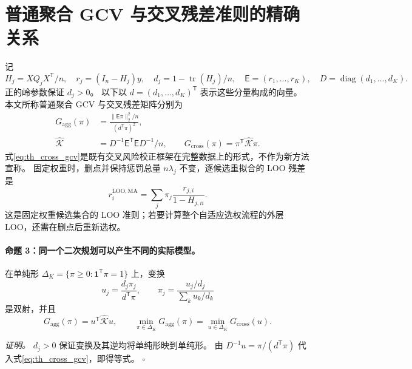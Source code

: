 \section{普通聚合 GCV 与交叉残差准则的精确关系}\label{sec:theory_gcv}
记
\begin{equation}\label{eq:th_gcv_notation}
 H_j=XQ_jX^{\mathsf T}/n,\quad r_j=(I_n-H_j)y,\quad
 d_j=1-\operatorname{tr}(H_j)/n,\quad
 \mathsf E=(r_1,\ldots,r_K),\quad D=\operatorname{diag}(d_1,\ldots,d_K).
\end{equation}
正的岭参数保证 $d_j>0$。
以下以 $d=(d_1,\ldots,d_K)^{\mathsf T}$ 表示这些分量构成的向量。
本文所称普通聚合 GCV 与交叉残差矩阵分别为
\begin{align}
 G_{\mathrm{agg}}(\pi)
 &=\frac{\lVert\mathsf E\pi\rVert_2^2/n}{(d^{\mathsf T}\pi)^2},\label{eq:th_agg_gcv}\\
 \widehat{\mathcal K}
 &=D^{-1}\mathsf E^{\mathsf T}\mathsf E D^{-1}/n,\qquad
 G_{\mathrm{cross}}(\pi)=\pi^{\mathsf T}\widehat{\mathcal K}\pi.
 \label{eq:th_cross_gcv}
\end{align}
式\eqref{eq:th_cross_gcv}是既有交叉风险校正框架在完整数据上的形式\cite{bellec}，不作为新方法宣称。
固定权重时，删点并保持惩罚总量 $n\lambda_j$ 不变，逐候选重拟合的 LOO 残差是
\begin{equation}\label{eq:th_loo}
 r_i^{\mathrm{LOO,MA}}=\sum_j\pi_j\frac{r_{j,i}}{1-H_{j,ii}}.
\end{equation}
这是固定权重候选集合的 LOO 准则；若要计算整个自适应选权流程的外层 LOO，还需在删点后重新选权。

\paragraph{命题 3：同一个二次规划可以产生不同的实际模型。}
在单纯形 $\Delta_K=\{\pi\ge0:\boldsymbol1^{\mathsf T}\pi=1\}$ 上，变换
\begin{equation}\label{eq:th_gcv_map}
 u_j=\frac{d_j\pi_j}{d^{\mathsf T}\pi},\qquad
 \pi_j=\frac{u_j/d_j}{\sum_k u_k/d_k}
\end{equation}
是双射，并且
\begin{equation}\label{eq:th_gcv_equiv}
 G_{\mathrm{agg}}(\pi)=u^{\mathsf T}\widehat{\mathcal K}u,\qquad
 \min_{\pi\in\Delta_K}G_{\mathrm{agg}}(\pi)
 =\min_{u\in\Delta_K}G_{\mathrm{cross}}(u).
\end{equation}

\textit{证明。}
$d_j>0$ 保证变换及其逆均将单纯形映到单纯形。
由 $D^{-1}u=\pi/(d^{\mathsf T}\pi)$ 代入式\eqref{eq:th_cross_gcv}，即得等式。
\hfill$\square$

